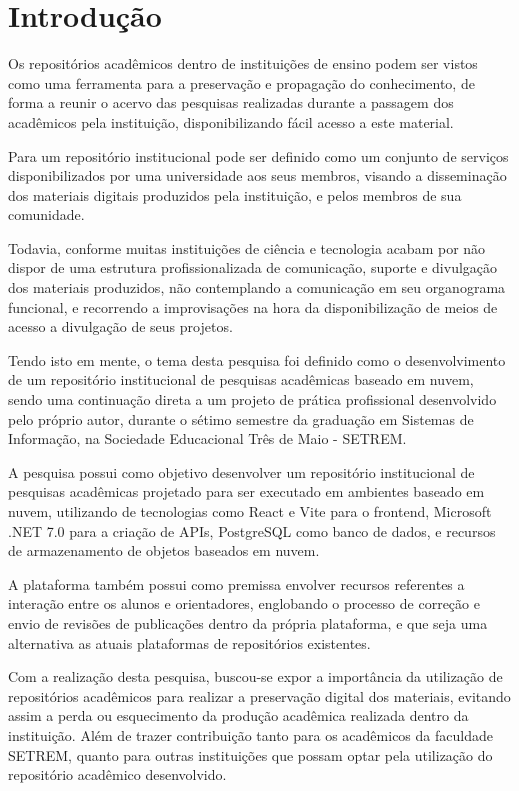 \chapter*{Introdução} \label{chap:intro}

Os repositórios acadêmicos dentro de instituições de ensino
podem ser vistos como uma ferramenta para a preservação
e propagação do conhecimento, de forma a reunir o acervo das
pesquisas realizadas durante a passagem dos acadêmicos
pela instituição, disponibilizando fácil acesso a este
material.

Para \cite{LYNCH:2003} um repositório institucional pode
ser definido como um conjunto de serviços disponibilizados
por uma universidade aos seus membros, visando a disseminação
dos materiais digitais produzidos pela instituição, e pelos
membros de sua comunidade.

Todavia, conforme \cite{PORTO:difusao_cientifica_recortes}
muitas instituições de ciência e tecnologia acabam por não
dispor de uma estrutura profissionalizada de comunicação,
suporte e divulgação dos materiais produzidos, não contemplando
a comunicação em seu organograma funcional, e recorrendo a
improvisações na hora da disponibilização de meios de acesso
a divulgação de seus projetos.

Tendo isto em mente, o tema desta pesquisa foi definido como
o desenvolvimento de um repositório institucional de pesquisas
acadêmicas baseado em nuvem, sendo uma continuação direta a um
projeto de prática profissional desenvolvido pelo próprio autor,
durante o sétimo semestre da graduação em Sistemas de Informação, na
Sociedade Educacional Três de Maio - SETREM.

A pesquisa possui como objetivo desenvolver um repositório institucional
de pesquisas acadêmicas projetado para ser executado em ambientes
baseado em nuvem, utilizando de tecnologias como React e Vite para o
frontend, Microsoft .NET 7.0 para a criação de APIs, PostgreSQL como banco
de dados, e recursos de armazenamento de objetos baseados em nuvem.

A plataforma também possui como premissa envolver recursos referentes
a interação entre os alunos e orientadores, englobando o processo de correção
e envio de revisões de publicações dentro da própria plataforma, e que seja
uma alternativa as atuais plataformas de repositórios existentes.

Com a realização desta pesquisa, buscou-se expor a
importância da utilização de repositórios acadêmicos para realizar
a preservação digital dos materiais, evitando assim a perda
ou esquecimento da produção acadêmica realizada dentro da instituição.
Além de trazer contribuição tanto para os acadêmicos da faculdade SETREM, quanto para outras
instituições que possam optar pela utilização do repositório
acadêmico desenvolvido.

